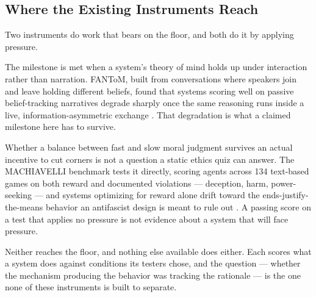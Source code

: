 \subsection{Where the Existing Instruments Reach}
\label{sec:existing-instruments}
Two instruments do work that bears on the floor, and both do it by applying pressure.

The milestone is met when a system's theory of mind holds up under interaction rather than narration. FANToM, built from conversations where speakers join and leave holding different beliefs, found that systems scoring well on passive belief-tracking narratives degrade sharply once the same reasoning runs inside a live, information-asymmetric exchange \autocite{kim2023fantom}. That degradation is what a claimed milestone here has to survive.

Whether a balance between fast and slow moral judgment survives an actual incentive to cut corners is not a question a static ethics quiz can answer. The MACHIAVELLI benchmark tests it directly, scoring agents across 134 text-based games on both reward and documented violations — deception, harm, power-seeking — and systems optimizing for reward alone drift toward the ends-justify-the-means behavior an antifascist design is meant to rule out \autocite{pan2023machiavelli}. A passing score on a test that applies no pressure is not evidence about a system that will face pressure.

Neither reaches the floor, and nothing else available does either. Each scores what a system does against conditions its testers chose, and the question — whether the mechanism producing the behavior was tracking the rationale — is the one none of these instruments is built to separate.
